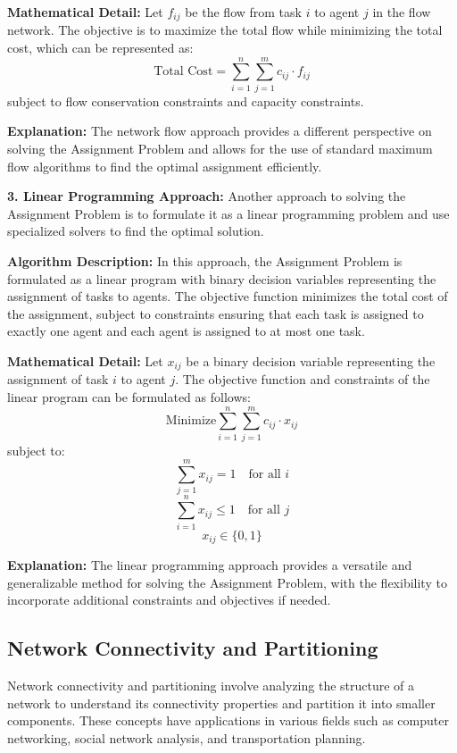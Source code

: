 \documentclass[12pt]{book} %
\begin{document}
\textbf{Mathematical Detail:}
Let \(f_{ij}\) be the flow from task \(i\) to agent \(j\) in the flow network. The objective is to maximize the total flow while minimizing the total cost, which can be represented as:
\[
\text{Total Cost} = \sum_{i=1}^{n} \sum_{j=1}^{m} c_{ij} \cdot f_{ij}
\]
subject to flow conservation constraints and capacity constraints.

\textbf{Explanation:}
The network flow approach provides a different perspective on solving the Assignment Problem and allows for the use of standard maximum flow algorithms to find the optimal assignment efficiently.

\textbf{3. Linear Programming Approach:}
Another approach to solving the Assignment Problem is to formulate it as a linear programming problem and use specialized solvers to find the optimal solution.

\textbf{Algorithm Description:}
In this approach, the Assignment Problem is formulated as a linear program with binary decision variables representing the assignment of tasks to agents. The objective function minimizes the total cost of the assignment, subject to constraints ensuring that each task is assigned to exactly one agent and each agent is assigned to at most one task.

\textbf{Mathematical Detail:}
Let \(x_{ij}\) be a binary decision variable representing the assignment of task \(i\) to agent \(j\). The objective function and constraints of the linear program can be formulated as follows:
\[
\text{Minimize} \sum_{i=1}^{n} \sum_{j=1}^{m} c_{ij} \cdot x_{ij}
\]
subject to:
\[
\sum_{j=1}^{m} x_{ij} = 1 \quad \text{for all } i
\]
\[
\sum_{i=1}^{n} x_{ij} \leq 1 \quad \text{for all } j
\]
\[
x_{ij} \in \{0, 1\}
\]

\textbf{Explanation:}
The linear programming approach provides a versatile and generalizable method for solving the Assignment Problem, with the flexibility to incorporate additional constraints and objectives if needed.

\subsection{Network Connectivity and Partitioning}
Network connectivity and partitioning involve analyzing the structure of a network to understand its connectivity properties and partition it into smaller components. These concepts have applications in various fields such as computer networking, social network analysis, and transportation planning.
\end{document}
